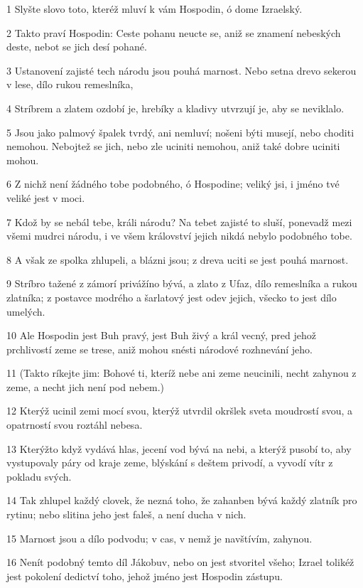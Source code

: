 \par 1 Slyšte slovo toto, kteréž mluví k vám Hospodin, ó dome Izraelský.
\par 2 Takto praví Hospodin: Ceste pohanu neucte se, aniž se znamení nebeských deste, nebot se jich desí pohané.
\par 3 Ustanovení zajisté tech národu jsou pouhá marnost. Nebo setna drevo sekerou v lese, dílo rukou remeslníka,
\par 4 Stríbrem a zlatem ozdobí je, hrebíky a kladivy utvrzují je, aby se neviklalo.
\par 5 Jsou jako palmový špalek tvrdý, ani nemluví; nošeni býti musejí, nebo choditi nemohou. Nebojtež se jich, nebo zle uciniti nemohou, aniž také dobre uciniti mohou.
\par 6 Z nichž není žádného tobe podobného, ó Hospodine; veliký jsi, i jméno tvé veliké jest v moci.
\par 7 Kdož by se nebál tebe, králi národu? Na tebet zajisté to sluší, ponevadž mezi všemi mudrci národu, i ve všem království jejich nikdá nebylo podobného tobe.
\par 8 A však ze spolka zhlupeli, a blázni jsou; z dreva uciti se jest pouhá marnost.
\par 9 Stríbro tažené z zámorí privážíno bývá, a zlato z Ufaz, dílo remeslníka a rukou zlatníka; z postavce modrého a šarlatový jest odev jejich, všecko to jest dílo umelých.
\par 10 Ale Hospodin jest Buh pravý, jest Buh živý a král vecný, pred jehož prchlivostí zeme se trese, aniž mohou snésti národové rozhnevání jeho.
\par 11 (Takto ríkejte jim: Bohové ti, kteríž nebe ani zeme neucinili, necht zahynou z zeme, a necht jich není pod nebem.)
\par 12 Kterýž ucinil zemi mocí svou, kterýž utvrdil okršlek sveta moudrostí svou, a opatrností svou roztáhl nebesa.
\par 13 Kterýžto když vydává hlas, jecení vod bývá na nebi, a kterýž pusobí to, aby vystupovaly páry od kraje zeme, blýskání s deštem privodí, a vyvodí vítr z pokladu svých.
\par 14 Tak zhlupel každý clovek, že nezná toho, že zahanben bývá každý zlatník pro rytinu; nebo slitina jeho jest faleš, a není ducha v nich.
\par 15 Marnost jsou a dílo podvodu; v cas, v nemž je navštívím, zahynou.
\par 16 Nenít podobný temto díl Jákobuv, nebo on jest stvoritel všeho; Izrael tolikéž jest pokolení dedictví toho, jehož jméno jest Hospodin zástupu.
